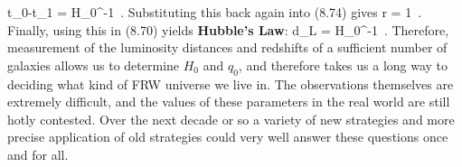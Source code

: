 \documentclass[12pt]{article}
\begin{document}
\be
  t_0-t_1 = H_0^{-1}\ .\label{8.76}
\ee
Substituting this back again into (8.74) gives
\be
  r = {1}\ .\label{8.77}
\ee
Finally, using this in (8.70) yields {\bf Hubble's Law}:
\be
  d_L = H_0^{-1}\ .
  \label{8.78}
\ee
Therefore, measurement of the luminosity distances and redshifts
of a sufficient number of galaxies allows us to determine $H_0$
and $q_0$, and therefore takes us a long way to deciding what kind
of FRW universe we live in.  The observations themselves are
extremely difficult, and the values of these parameters in the
real world are still hotly contested.  Over the next decade or so
a variety of new strategies and more precise application of
old strategies could very well answer these questions once and for
all.
\end{document}
